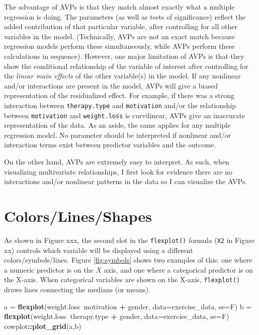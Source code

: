 \documentclass[,]{book}
\newenvironment{Shaded}{\begin{snugshade}}{\end{snugshade}}
\newcommand{\KeywordTok}[1]{\textcolor[rgb]{0.13,0.29,0.53}{\textbf{#1}}}
\newcommand{\DataTypeTok}[1]{\textcolor[rgb]{0.13,0.29,0.53}{#1}}
\newcommand{\StringTok}[1]{\textcolor[rgb]{0.31,0.60,0.02}{#1}}
\newcommand{\OperatorTok}[1]{\textcolor[rgb]{0.81,0.36,0.00}{\textbf{#1}}}
\newcommand{\NormalTok}[1]{#1}
\begin{document}
The advantage of AVPs is that they match almost exactly what a multiple
regression is doing. The parameters (as well as tests of significance)
reflect the added contribution of that particular variable, after
controlling for all other variables in the model. (Technically, AVPs are
not an exact match because regression models perform these
simultaneously, while AVPs perform these calculations in sequence).
However, one major limitation of AVPs is that they show the conditional
relationship of the variable of interest after controlling for the
\emph{linear main effects} of the other variable(s) in the model. If any
nonlinear and/or interactions are present in the model, AVPs will give a
biased representation of the residualized effect. For example, if there
was a strong interaction between \texttt{therapy.type} and
\texttt{motivation} and/or the relationship between \texttt{motivation}
and \texttt{weight.loss} is curvilinear, AVPs give an inaccurate
representation of the data. As an aside, the same applies for any
multiple regression model. No parameter should be interpreted if
nonlinear and/or interaction terms exist between predictor variables and
the outcome.

On the other hand, AVPs are extremely easy to interpret. As such, when
visualizing multivariate relationships, I first look for evidence there
are no interactions and/or nonlinear patterns in the data so I can
visualize the AVPs.

\section*{Colors/Lines/Shapes}\label{colorslinesshapes}

As shown in Figure xxx, the second slot in the \texttt{flexplot()}
formula (\texttt{X2} in Figure xx) controls which variable will be
displayed using a different colors/symbols/lines. Figure
\ref{fig:symbols} shows two examples of this: one where a numeric
predictor is on the \(X\) axis, and one where a categorical predictor is
on the X-axis. When categorical variables are shown on the X-axis,
\texttt{flexplot()} draws lines connecting the medians (or means).

\begin{Shaded}
\begin{Highlighting}[]
\NormalTok{a =}\StringTok{ }\KeywordTok{flexplot}\NormalTok{(weight.loss}\OperatorTok{~}\NormalTok{motivation }\OperatorTok{+}\StringTok{ }\NormalTok{gender, }\DataTypeTok{data=}\NormalTok{exercise_data, }\DataTypeTok{se=}\NormalTok{F)}
\NormalTok{b =}\StringTok{ }\KeywordTok{flexplot}\NormalTok{(weight.loss}\OperatorTok{~}\NormalTok{therapy.type }\OperatorTok{+}\StringTok{ }\NormalTok{gender, }\DataTypeTok{data=}\NormalTok{exercise_data, }\DataTypeTok{se=}\NormalTok{F)}
\NormalTok{cowplot}\OperatorTok{::}\KeywordTok{plot_grid}\NormalTok{(a,b)}
\end{Highlighting}
\end{Shaded}
\end{document}
